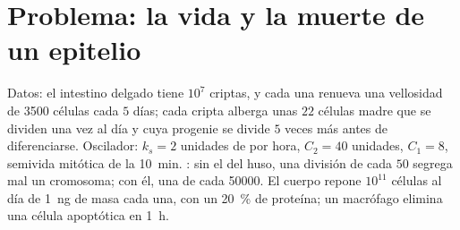 \section{Problema: la vida y la muerte de un epitelio}

\begin{problem}
\label{pb:b3:cell-cycle-apoptosis:1}
Datos: el intestino delgado tiene $10^{7}$ criptas, y cada una renueva
una vellosidad de \num{3500} células cada $5$ días; cada cripta alberga
unas $22$ células madre que se dividen una vez al día y cuya progenie se
divide $5$ veces más antes de diferenciarse. Oscilador: $k_{s} = 2$
unidades de  por hora, $C_{2} = 40$ unidades, $C_{1} = 8$,
semivida mitótica de la  \qty{10}{min}. : sin el
 del huso, una división de cada $50$ segrega mal un
cromosoma; con él, una de cada \num{50000}. El cuerpo repone $10^{11}$
células al día de \qty{1}{ng} de masa cada una, con un \qty{20}{\%} de
proteína; un macrófago elimina una célula apoptótica en \qty{1}{h}.


\end{problem}
